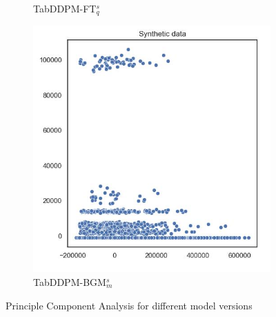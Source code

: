 \begin{figure}[h]
\begin{subfigure}{0.3\textwidth}
		\caption{TabDDPM-FT$^{s}_q$}
    \end{subfigure}
	\begin{subfigure}{0.3\textwidth}
		\includegraphics[width=\textwidth]{images/pca/tab-ddpm-bgm-simTune-minmax.jpg}
		\caption{TabDDPM-BGM$^{s}_m$}
		\label{fig_a:pca_TabDDPMBM}
    \end{subfigure}
    \caption[PCA plots Experiment Models]{Principle Component Analysis for different model versions}
    \label{fig_a:pca_diff}
\end{figure}
\newpage


